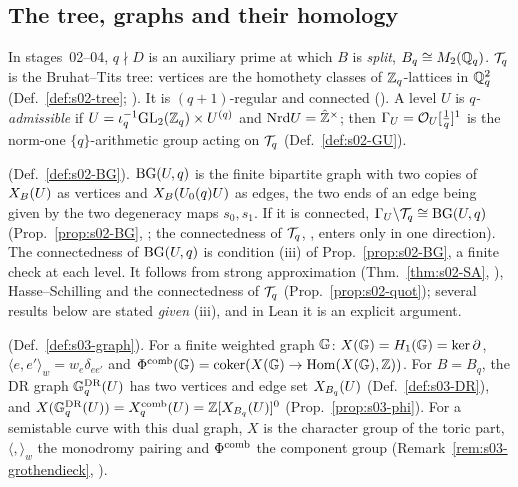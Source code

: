 \subsection{The tree, graphs and their homology}\label{ss:s00-tree}
\begin{description}[leftmargin=0pt,itemsep=3pt]
\item[Tree prime] In stages~02--04, $q\nmid D$ is an auxiliary prime at which $B$ is \emph{split}, $B_q\cong M_2(\mathbb{Q}_q)$. $\mathcal{T}_q$ is the
  Bruhat--Tits tree: vertices are the homothety classes of $\mathbb{Z}_q$-lattices in $\mathbb{Q}_q^2$ (Def.~\ref{def:s02-tree}; \cite[II.1.1]{Se}).
  It is $(q+1)$-regular and connected (\stcited). A level $U$ is \emph{$q$-admissible} if
  $U=\iota_q^{-1}\mathrm{GL}_2(\mathbb{Z}_q)\times U^{(q)}$ and $\mathrm{Nrd} U=\hat{\mathbb{Z}}^\times$; then $\Gamma_U=\mathcal{O}_U[\frac1q]^1$ is the norm-one $\{q\}$-arithmetic
  group acting on $\mathcal{T}_q$ (Def.~\ref{def:s02-GU}).
\item[Brandt graph] (Def.~\ref{def:s02-BG}). $\mathrm{BG}(U,q)$ is the finite bipartite graph with two copies of $X_B(U)$ as vertices and
  $X_B(U_0(q)U)$ as edges, the two ends of an edge being given by the two degeneracy maps $s_0,s_1$. If it is connected,
  $\Gamma_U\backslash\mathcal{T}_q\cong\mathrm{BG}(U,q)$ (Prop.~\ref{prop:s02-BG}, \stproved; the connectedness of $\mathcal{T}_q$, \stcited, enters only in one
  direction). The connectedness of $\mathrm{BG}(U,q)$ is condition (iii) of Prop.~\ref{prop:s02-BG}, a finite check at each level. It
  follows from strong approximation (Thm.~\ref{thm:s02-SA}, \stcited), Hasse--Schilling and the connectedness of $\mathcal{T}_q$
  (Prop.~\ref{prop:s02-quot}); several results below are stated \emph{given} (iii), and in Lean it is an explicit argument.
\item[Weighted graphs] (Def.~\ref{def:s03-graph}). For a finite weighted graph $\mathbb{G}$: $X(\mathbb{G})=H_1(\mathbb{G})=\ker\partial$,
  $\langle e,e'\rangle_w=w_e\delta_{ee'}$ and $\Phi^{\mathrm{comb}}(\mathbb{G})=\operatorname{coker}(X(\mathbb{G})\to\operatorname{Hom}(X(\mathbb{G}),\mathbb{Z}))$. For $B=B_q$, the DR graph $\mathbb{G}^{\mathrm{DR}}_q(U)$ has
  two vertices and edge set $X_{B_q}(U)$ (Def.~\ref{def:s03-DR}), and $X(\mathbb{G}^{\mathrm{DR}}_q(U))=X^{\mathrm{comb}}_q(U)=\mathbb{Z}[X_{B_q}(U)]^0$ (Prop.~\ref{prop:s03-phi}). For a
  semistable curve with this dual graph, $X$ is the character group of the toric part, $\langle,\rangle_w$ the monodromy pairing and
  $\Phi^{\mathrm{comb}}$ the component group (Remark~\ref{rem:s03-grothendieck}, \stcited).
\end{description}

